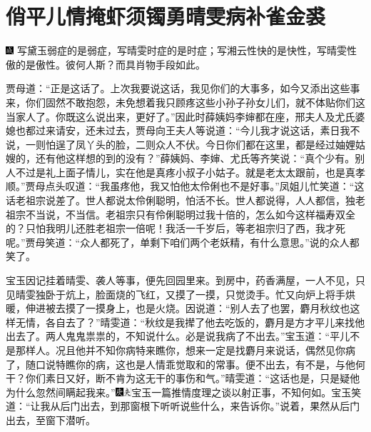

\chapter{俏平儿情掩虾须镯\hspace{.5em}勇晴雯病补雀金裘}

{\includegraphics[width=3mm]{../Images/00005}  \kaishu 写黛玉弱症的是弱症，写晴雯时症的是时症；写湘云性快的是快性，写晴雯性傲的是傲性。彼何人斯？而具肖物手段如此。}

贾母道：``正是这话了。上次我要说这话，我见你们的大事多，如今又添出这些事来，你们固然不敢抱怨，未免想着我只顾疼这些小孙子孙女儿们，就不体贴你们这当家人了。你既这么说出来，更好了。''因此时薛姨妈李婶都在座，邢夫人及尤氏婆媳也都过来请安，还未过去，贾母向王夫人等说道：``今儿我才说这话，素日我不说，一则怕逞了凤丫头的脸，二则众人不伏。今日你们都在这里，都是经过妯娌姑嫂的，还有他这样想的到的没有？''薛姨妈、李婶、尤氏等齐笑说：``真个少有。别人不过是礼上面子情儿，实在他是真疼小叔子小姑子。就是老太太跟前，也是真孝顺。''贾母点头叹道：``我虽疼他，我又怕他太伶俐也不是好事。''凤姐儿忙笑道：``这话老祖宗说差了。世人都说太伶俐聪明，怕活不长。世人都说得，人人都信，独老祖宗不当说，不当信。老祖宗只有伶俐聪明过我十倍的，怎么如今这样福寿双全的？只怕我明儿还胜老祖宗一倍呢！我活一千岁后，等老祖宗归了西，我才死呢。''贾母笑道：``众人都死了，单剩下咱们两个老妖精，有什么意思。''说的众人都笑了。

宝玉因记挂着晴雯、袭人等事，便先回园里来。到房中，药香满屋，一人不见，只见晴雯独卧于炕上，脸面烧的飞红，又摸了一摸，只觉烫手。忙又向炉上将手烘暖，伸进被去摸了一摸身上，也是火烧。因说道：``别人去了也罢，麝月秋纹也这样无情，各自去了？''晴雯道：``秋纹是我撵了他去吃饭的，麝月是方才平儿来找他出去了。两人鬼鬼祟祟的，不知说什么。必是说我病了不出去。''宝玉道：``平儿不是那样人。况且他并不知你病特来瞧你，想来一定是找麝月来说话，偶然见你病了，随口说特瞧你的病，这也是人情乖觉取和的常事。便不出去，有不是，与他何干？你们素日又好，断不肯为这无干的事伤和气。''晴雯道：``这话也是，只是疑他为什么忽然间瞒起我来。''{\includegraphics[width=3mm]{../Images/00004}\includegraphics[width=3mm]{../Images/00012}\footnotesize \kaishu 宝玉一篇推情度理之谈以射正事，不知何如。}宝玉笑道：``让我从后门出去，到那窗根下听听说些什么，来告诉你。''说着，果然从后门出去，至窗下潜听。

